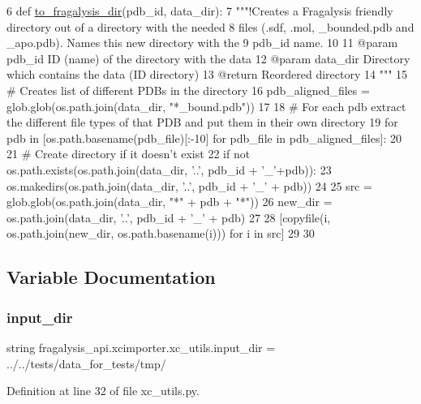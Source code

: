 \begin{DoxyCode}
6 \textcolor{keyword}{def }\hyperlink{namespacefragalysis__api_1_1xcimporter_1_1xc__utils_a20b9e349b37bfbf70c38bfaf1a42876f}{to\_fragalysis\_dir}(pdb\_id, data\_dir):
7     \textcolor{stringliteral}{"""!Creates a Fragalysis friendly directory out of a directory with the needed}
8 \textcolor{stringliteral}{    files (.sdf, .mol, \_bounded.pdb and \_apo.pdb). Names this new directory with the}
9 \textcolor{stringliteral}{    pdb\_id name.}
10 \textcolor{stringliteral}{}
11 \textcolor{stringliteral}{    @param pdb\_id ID (name) of the directory with the data}
12 \textcolor{stringliteral}{    @param data\_dir Directory which contains the data (ID directory)}
13 \textcolor{stringliteral}{    @return Reordered directory}
14 \textcolor{stringliteral}{    """}
15     \textcolor{comment}{# Creates list of different PDBs in the directory}
16     pdb\_aligned\_files = glob.glob(os.path.join(data\_dir, \textcolor{stringliteral}{"*\_bound.pdb"}))
17 
18     \textcolor{comment}{# For each pdb extract the different file types of that PDB and put them in their own directory}
19     \textcolor{keywordflow}{for} pdb \textcolor{keywordflow}{in} [os.path.basename(pdb\_file)[:-10] \textcolor{keywordflow}{for} pdb\_file \textcolor{keywordflow}{in} pdb\_aligned\_files]:
20 
21         \textcolor{comment}{# Create directory if it doesn't exist}
22         \textcolor{keywordflow}{if} \textcolor{keywordflow}{not} os.path.exists(os.path.join(data\_dir, \textcolor{stringliteral}{'..'}, pdb\_id + \textcolor{stringliteral}{'\_'}+pdb)):
23             os.makedirs(os.path.join(data\_dir, \textcolor{stringliteral}{'..'}, pdb\_id + \textcolor{stringliteral}{'\_'} + pdb))
24 
25         src = glob.glob(os.path.join(data\_dir, \textcolor{stringliteral}{"*"} + pdb + \textcolor{stringliteral}{"*"}))
26         new\_dir = os.path.join(data\_dir, \textcolor{stringliteral}{'..'}, pdb\_id + \textcolor{stringliteral}{'\_'} + pdb)
27 
28         [copyfile(i, os.path.join(new\_dir, os.path.basename(i))) \textcolor{keywordflow}{for} i \textcolor{keywordflow}{in} src]
29 
30 
\end{DoxyCode}


\subsection{Variable Documentation}
\mbox{\label{namespacefragalysis__api_1_1xcimporter_1_1xc__utils_a8e1ebabddefaec139b57091c2aee7c87}} 
\subsubsection{\texorpdfstring{input\+\_\+dir}{input\_dir}}
{\footnotesize\ttfamily string fragalysis\+\_\+api.\+xcimporter.\+xc\+\_\+utils.\+input\+\_\+dir = \textquotesingle{}../../tests/data\+\_\+for\+\_\+tests/tmp/\textquotesingle{}}



Definition at line 32 of file xc\+\_\+utils.\+py.

